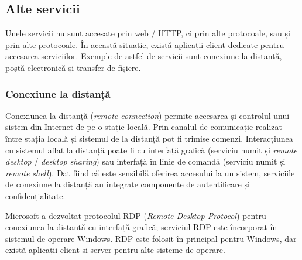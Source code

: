 
\subsection{Alte servicii}
\label{sec:net:apps:other}

Unele servicii nu sunt accesate prin web / HTTP, ci prin alte protocoale, sau și prin alte protocoale.
În această situație, există aplicații client dedicate pentru accesarea serviciilor.
Exemple de astfel de servicii sunt conexiune la distanță, poștă electronică și transfer de fișiere.

\subsubsection{Conexiune la distanță}
\label{sec:net:apps:other:remote}

Conexiunea la distanță (\textit{remote connection}) permite accesarea și controlul unui sistem din Internet de pe o stație locală.
Prin canalul de comunicație realizat între stația locală și sistemul de la distanță pot fi trimise comenzi.
Interacțiunea cu sistemul aflat la distanță poate fi cu interfață grafică (serviciu numit și \textit{remote desktop} / \textit{desktop sharing}) sau interfață în linie de comandă (serviciu numit și \textit{remote shell}).
Dat fiind că este sensibilă oferirea accesului la un sistem, serviciile de conexiune la distanță au integrate componente de autentificare și confidențialitate.

Microsoft a dezvoltat protocolul RDP  (\textit{Remote Desktop Protocol}) pentru conexiunea la distanță cu interfață grafică;
serviciul RDP este încorporat în sistemul de operare Windows.
RDP este folosit în principal pentru Windows, dar există aplicații client și server pentru alte sisteme de operare.

